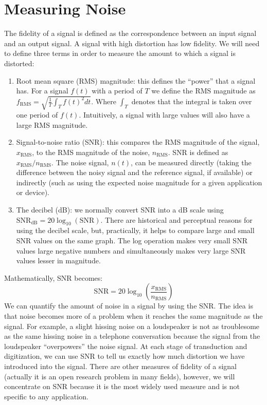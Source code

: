 \section{Measuring Noise}
The fidelity of a signal is defined as the correspondence between an
input signal and an output signal. A signal with high distortion has
low fidelity. We will need to define three terms in order to measure
the amount to which a signal is distorted:
\begin{enumerate}
\item Root mean square (RMS) magnitude: this defines the ``power''
  that a signal has. For a signal $f(t)$ with a period of $T$ we
  define the RMS magnitude as
  $f_\mathrm{RMS}=\sqrt{\frac{1}{T}\int_{T}f(t)^2 dt}$. Where $\int_T$
  denotes that the integral is taken over one period of
  $f(t)$. Intuitively, a signal with large values will also have a
  large RMS magnitude.
\item Signal-to-noise ratio (SNR): this compares the RMS magnitude of
  the signal, $x_\mathrm{RMS}$, to the RMS magnitude of the noise,
  $n_\mathrm{RMS}$. SNR is defined as
  $x_\mathrm{RMS}/n_\mathrm{RMS}$. The noise signal, $n(t)$, can be
  measured directly (taking the difference between the noisy signal
  and the reference signal, if available) or indirectly (such as using
  the expected noise magnitude for a given application or device).
\item The decibel (dB): we normally convert SNR into a dB scale using
  $\text{SNR}_\mathrm{dB}=20\log_{10}(\text{SNR})$. There are
  historical and perceptual reasons for using the decibel scale, but,
  practically, it helps to compare large and small SNR values on the
  same graph. The log operation makes very small SNR values large
  negative numbers and simultaneously makes very large SNR values
  lesser in magnitude.
\end{enumerate}
Mathematically, SNR becomes:
\[
\text{SNR}=20\log_{10}\left(\frac{x_\mathrm{RMS}}{n_\mathrm{RMS}}\right) \label{eq:SNR}
\]
We can quantify the amount of noise in a signal by using the SNR. The
idea is that noise becomes more of a problem when it reaches the same
magnitude as the signal. For example, a slight hissing noise on a
loudspeaker is not as troublesome as the same hissing noise in a
telephone conversation because the signal from the loudspeaker
``overpowers'' the noise signal. At each stage of transduction and
digitization, we can use SNR to tell us exactly how much distortion we
have introduced into the signal. There are other measures of fidelity
of a signal (actually it is an open research problem in many fields),
however, we will concentrate on SNR because it is the most widely used
measure and is not specific to any application.

